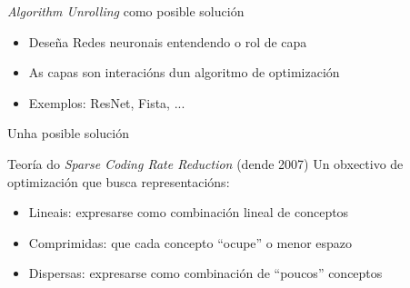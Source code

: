 \documentclass{beamer}
\begin{document}
\begin{frame}{\textit{Algorithm Unrolling} como posible solución}
				\begin{block}{}
				\begin{itemize}
		\item  Deseña Redes neuronais entendendo o rol de capa
		\item  As capas son interacións dun algoritmo de optimización
		\item Exemplos: ResNet, Fista, ...
					\end{itemize}
\end{block} \pause
			\centering	{}
\end{frame}

%


\begin{frame}{Unha posible solución}
				\begin{block}{Teoría do \textit{Sparse Coding Rate Reduction} (dende 2007)}
	Un obxectivo de optimización que busca representacións: \pause
    \begin{itemize}
						\item \textcolor{udcpink}{Lineais:} expresarse como combinación lineal de conceptos  \pause
						\item \textcolor{udcpink}{Comprimidas:} que cada concepto ``ocupe'' o menor espazo\pause
						\item \textcolor{udcpink}{Dispersas:} expresarse como combinación de ``poucos'' conceptos
    \end{itemize}
\end{block}\pause
			\centering	{}
\end{frame}
\end{document}
